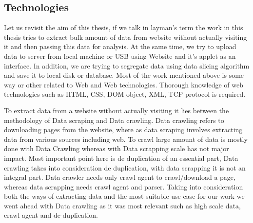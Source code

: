 \documentclass[article,type=msc,colorback,accentcolor=tud9c,twoside,11pt]{tudthesis}
\begin{document}
\subsection{Technologies}
Let us revisit the aim of this thesis, if we talk in layman's term the work in this thesis tries to extract bulk amount of data from website without actually visiting it and then passing this data for analysis. At the same time, we try to upload data to server from local machine or USB using Website and it's applet as an interface. In addition, we are trying to segregate data using data slicing algorithm and save it to local disk or database. Most of the work mentioned above is some way or other related to Web and Web technologies. Thorough knowledge of web technologies such as HTML, CSS, DOM object, XML, TCP protocol is required.

To extract data from a website without actually visiting it lies between the methodology of Data scraping and Data crawling. Data crawling refers to downloading pages from the website, where as data scraping involves extracting data from various sources including web. To crawl  large amount of data is mostly done with Data Crawling whereas with Data scrapping scale has not major impact. Most important point here is de duplication of an essential part, Data crawling takes into consideration de duplication, with data scrapping it is not an integral part. Data crawler needs only crawl agent to crawl/download a page, whereas data scrapping needs crawl agent and parser. Taking into consideration both the ways of extracting data and the most suitable use case for our work we went ahead with Data crawling as it was most relevant such as high scale data, crawl agent and de-duplication.
\end{document}
